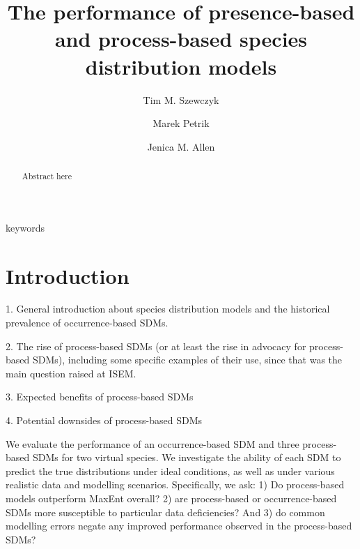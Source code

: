 \documentclass[preprint,review,times,12pt]{elsarticle}
\begin{document}
\begin{frontmatter}

\title{The performance of presence-based and process-based species distribution models}

\author[NREN,CS]{Tim M. Szewczyk}
\author[CS]{Marek Petrik}
\author[NREN]{Jenica M. Allen}

\address[NREN]{Department of Natural Resources and the Environment, University of New Hampshire}
\address[CS]{Department of Computer Science, University of New Hampshire}

\begin{abstract}
Abstract here
\end{abstract}

\begin{keyword}
keywords
\end{keyword}

\end{frontmatter}
\linenumbers



\section{Introduction}
\label{S:1}
1. General introduction about species distribution models and the historical prevalence of occurrence-based SDMs.

2. The rise of process-based SDMs (or at least the rise in advocacy for process-based SDMs), including some specific examples of their use, since that was the main question raised at ISEM.  

3. Expected benefits of process-based SDMs

4. Potential downsides of process-based SDMs

We evaluate the performance of an occurrence-based SDM and three process-based SDMs for two virtual species. We investigate the ability of each SDM  to predict the true distributions under ideal conditions, as well as under various realistic data and modelling scenarios. Specifically, we ask: 1) Do process-based models outperform MaxEnt overall? 2) are process-based or occurrence-based SDMs more susceptible to particular data deficiencies? And 3) do common modelling errors negate any improved performance observed in the process-based SDMs?
\end{document}
